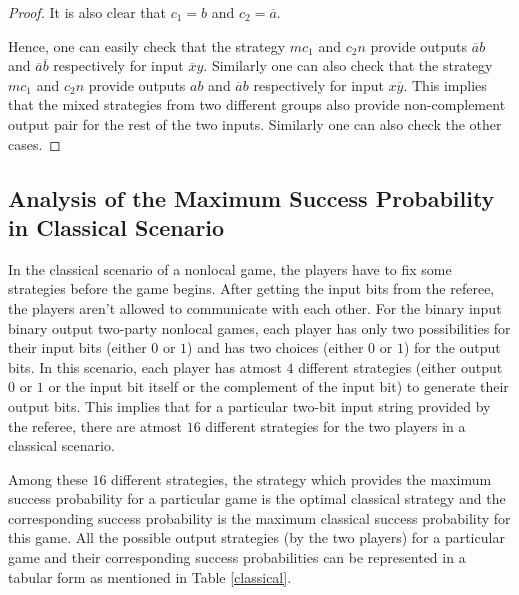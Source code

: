 \documentclass[]{svjour3}
\begin{document}
\begin{proof}
It is also clear that $c_1 = b$ and $c_2 = \overline{a}$.

Hence, one can easily check that the strategy $mc_1$ and $c_2n$ provide outputs $\overline{a}b$ and $\overline{a}\overline{b}$ respectively for input $\overline{x}y$. Similarly one can also check that the strategy $mc_1$ and $c_2n$ provide outputs $ab$ and $\overline{a}b$ respectively for input $x\overline{y}$. This implies that the mixed strategies from two different groups also provide non-complement output pair for the rest of the two inputs. Similarly one can also check the other cases.
\end{proof}

\subsection{Analysis of the Maximum Success Probability in Classical Scenario}
\label{class}

In the classical scenario of a nonlocal game, the players have to fix some strategies before the game begins. After getting the input bits from the referee, the players aren't allowed to communicate with each other. For the binary input binary output two-party nonlocal games, each player has only two possibilities for their input bits (either $0$ or $1$) and has two choices (either $0$ or $1$) for the output bits. In this scenario, each player has atmost $4$ different strategies (either output $0$ or $1$ or the input bit itself or the complement of the input bit) to generate their output bits. This implies that for a particular two-bit input string provided by the referee, there are atmost $16$ different strategies for the two players in a classical scenario. 

Among these $16$ different strategies, the strategy which provides the maximum success probability for a particular game is the optimal classical strategy and the corresponding success probability is the maximum classical success probability for this game. All the possible output strategies (by the two players) for a particular game and their corresponding success probabilities can be represented in a tabular form as mentioned in Table \ref{classical}.
\end{document}
